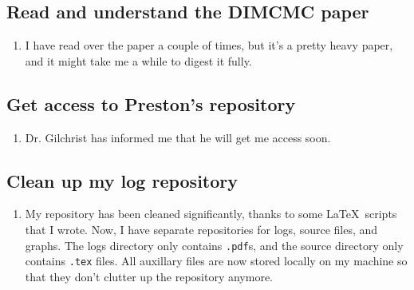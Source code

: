 \documentclass[12 pt]{article}
\begin{document}
	\subsection{Read and understand the DIMCMC paper}
	\begin{enumerate}
		\item I have read over the paper a couple of times, but it's a pretty heavy paper, and it might take me a while to digest it fully.
	\end{enumerate}
	
	\subsection{Get access to Preston's repository}
	\begin{enumerate}
		\item Dr. Gilchrist has informed me that he will get me access soon.
	\end{enumerate}
	
	\subsection{Clean up my log repository}
	\begin{enumerate}
		\item My repository has been cleaned significantly, thanks to some \LaTeX\ scripts that I wrote. Now, I have separate repositories for logs, source files, and graphs. The logs directory only contains \texttt{.pdf}s, and the source directory only contains \texttt{.tex} files. All auxillary files are now stored locally on my machine so that they don't clutter up the repository anymore. 
	\end{enumerate}
\end{document}
